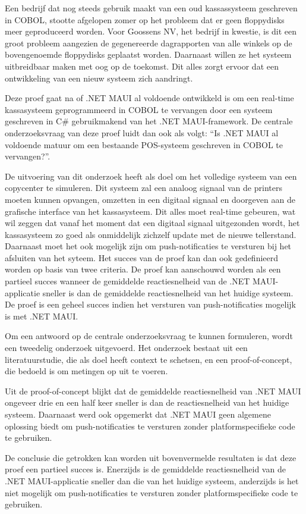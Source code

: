 Een bedrijf dat nog steeds gebruik maakt van een oud kassassysteem geschreven in COBOL, stootte afgelopen zomer op het probleem dat er geen floppydisks meer geproduceerd worden. Voor Goossens NV, het bedrijf in kwestie, is dit een groot probleem aangezien de gegenereerde dagrapporten van alle winkels op de bovengenoemde floppydisks geplaatst worden. Daarnaast willen ze het systeem uitbreidbaar maken met oog op de toekomst. Dit alles zorgt ervoor dat een ontwikkeling van een nieuw systeem zich aandringt.

Deze proef gaat na of .NET MAUI al voldoende ontwikkeld is om een real-time kassasysteem geprogrammeerd in COBOL te vervangen door een systeem geschreven in C\# gebruikmakend van het .NET MAUI-framework. De centrale onderzoeksvraag van deze proef luidt dan ook als volgt: ``Is .NET MAUI al voldoende matuur om een bestaande POS-systeem geschreven in COBOL te vervangen?''.

De uitvoering van dit onderzoek heeft als doel om het volledige systeem van een copycenter te simuleren. Dit systeem zal een analoog signaal van de printers moeten kunnen opvangen, omzetten in een digitaal signaal en doorgeven aan de grafische interface van het kassasysteem. Dit alles moet real-time gebeuren, wat wil zeggen dat vanaf het moment dat een digitaal signaal uitgezonden wordt, het kassasysteem zo goed als onmiddelijk zichzelf update met de nieuwe tellerstand. Daarnaast moet het ook mogelijk zijn om push-notificaties te versturen bij het afsluiten van het syteem. Het succes van de proef kan dan ook gedefinieerd worden op basis van twee criteria. De proef kan aanschouwd worden als een partieel succes wanneer de gemiddelde reactiesnelheid van de .NET MAUI-applicatie sneller is dan de gemiddelde reactiesnelheid van het huidige systeem. De proef is een geheel succes indien het versturen van push-notificaties mogelijk is met .NET MAUI.

Om een antwoord op de centrale onderzoeksvraag te kunnen formuleren, wordt een tweedelig onderzoek uitgevoerd. Het onderzoek bestaat uit een literatuurstudie, die als doel heeft context te schetsen, en een proof-of-concept, die bedoeld is om metingen op uit te voeren.

Uit de proof-of-concept blijkt dat de gemiddelde reactiesnelheid van .NET MAUI ongeveer drie en een half keer sneller is dan de reactiesnelheid van het huidige systeem. Daarnaast werd ook opgemerkt dat .NET MAUI geen algemene oplossing biedt om push-notificaties te versturen zonder platformspecifieke code te gebruiken.

De conclusie die getrokken kan worden uit bovenvermelde resultaten is dat deze proef een partieel succes is. Enerzijds is de gemiddelde reactiesnelheid van de .NET MAUI-applicatie sneller dan die van het huidige systeem, anderzijds is het niet mogelijk om push-notificaties te versturen zonder platformspecifieke code te gebruiken.
